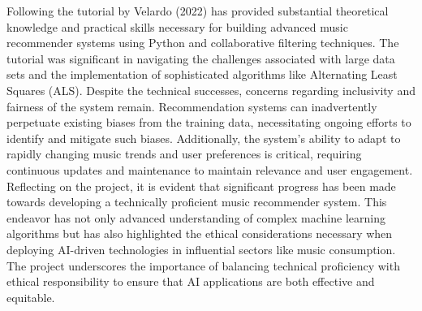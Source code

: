 \documentclass[10pt,twocolumn]{article}
\begin{document}
Following the tutorial by Velardo (2022) has provided substantial theoretical knowledge and practical skills necessary for building advanced music recommender systems using Python and collaborative filtering techniques. The tutorial was significant in navigating the challenges associated with large data sets and the implementation of sophisticated algorithms like Alternating Least Squares (ALS).
Despite the technical successes, concerns regarding inclusivity and fairness of the system remain. Recommendation systems can inadvertently perpetuate existing biases from the training data, necessitating ongoing efforts to identify and mitigate such biases. Additionally, the system's ability to adapt to rapidly changing music trends and user preferences is critical, requiring continuous updates and maintenance to maintain relevance and user engagement.
Reflecting on the project, it is evident that significant progress has been made towards developing a technically proficient music recommender system. This endeavor has not only advanced understanding of complex machine learning algorithms but has also highlighted the ethical considerations necessary when deploying AI-driven technologies in influential sectors like music consumption. The project underscores the importance of balancing technical proficiency with ethical responsibility to ensure that AI applications are both effective and equitable.
\end{document}
